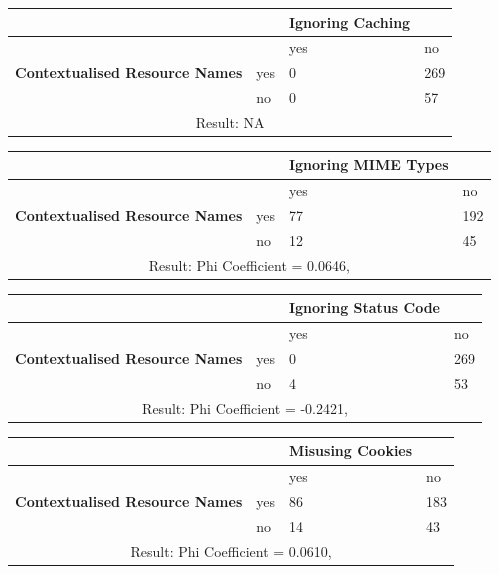 \documentclass[a4paper,12pt]{article}
\begin{document}
\begin{center}
  \begin{tabular}{| p{60mm} | p{10mm} | p{35mm} | p{35mm} |}
  \hline
   & & \textbf{Ignoring Caching} &
  \\
  \hline
  & & yes & no
  \\
  \hline
  \textbf{Contextualised Resource Names} & yes & 0 & 269
  \\
  \hline
   & no & 0 & 57
  \\
  \hline
  \multicolumn{4}{|c|}{Result: NA}
  \\ \hline
  \end{tabular}
  \end{center}

\begin{center}
  \begin{tabular}{| p{60mm} | p{10mm} | p{35mm} | p{35mm} |}
  \hline
   & & \textbf{Ignoring MIME Types} &
  \\
  \hline
  & & yes & no
  \\
  \hline
  \textbf{Contextualised Resource Names} & yes & 77 & 192
  \\
  \hline
   & no & 12 & 45
  \\
  \hline
  \multicolumn{4}{|c|}{Result: Phi Coefficient = 0.0646, }
  \\ \hline
  \end{tabular}
  \end{center}

\begin{center}
  \begin{tabular}{| p{60mm} | p{10mm} | p{35mm} | p{35mm} |}
  \hline
   & & \textbf{Ignoring Status Code} &
  \\
  \hline
  & & yes & no
  \\
  \hline
  \textbf{Contextualised Resource Names} & yes & 0 & 269
  \\
  \hline
   & no & 4 & 53
  \\
  \hline
  \multicolumn{4}{|c|}{Result: Phi Coefficient = -0.2421, }
  \\ \hline
  \end{tabular}
  \end{center}

\begin{center}
  \begin{tabular}{| p{60mm} | p{10mm} | p{35mm} | p{35mm} |}
  \hline
   & & \textbf{Misusing Cookies} &
  \\
  \hline
  & & yes & no
  \\
  \hline
  \textbf{Contextualised Resource Names} & yes & 86 & 183
  \\
  \hline
   & no & 14 & 43
  \\
  \hline
  \multicolumn{4}{|c|}{Result: Phi Coefficient = 0.0610, }
  \\ \hline
  \end{tabular}
  \end{center}
\end{document}

